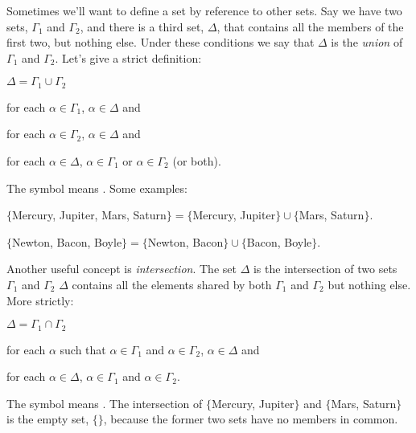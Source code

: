 Sometimes we'll want to define a set by reference to other sets. Say we have two sets, $\Gamma_1$ and $\Gamma_2$, and there is a third set, $\Delta$, that contains all the members of the first two, but nothing else. Under these conditions we say that $\Delta$ is the \emph{union} of $\Gamma_1$ and $\Gamma_2$. Let's give a strict definition:

\begin{majorILnc}{} $\Delta=\Gamma_1\cup\Gamma_2$ \Iff 
	\begin{cenumerate}
		\item for each $\alpha \in \Gamma_1$, $\alpha \in \Delta$ and
		\item for each $\alpha \in \Gamma_2$, $\alpha \in \Delta$ and
		\item for each $\alpha \in \Delta$, $\alpha \in \Gamma_1$ or $\alpha \in \Gamma_2$ (or both).
	\end{cenumerate}	
\end{majorILnc} 

\noindent{}The symbol \mention{$\cup$} means . Some examples:

\begin{center}
	\noindent{}$\{$Mercury, Jupiter, Mars, Saturn$\}=\{$Mercury, Jupiter$\}\cup\{$Mars, Saturn$\}$.
\end{center}

\begin{center}
	\noindent{}$\{$Newton, Bacon, Boyle$\}=\{$Newton, Bacon$\}\cup\{$Bacon, Boyle$\}$.
\end{center}

Another useful concept is \emph{intersection}.  The set $\Delta$ is the intersection of two sets $\Gamma_1$ and $\Gamma_2$ \Iff $\Delta$ contains all the elements shared by both $\Gamma_1$ and $\Gamma_2$ but nothing else. More strictly:

\begin{majorILnc}{} $\Delta=\Gamma_1\cap\Gamma_2$ \Iff 
	\begin{cenumerate}
		\item for each $\alpha$ such that $\alpha \in \Gamma_1$ and $\alpha \in \Gamma_2$, $\alpha \in \Delta$ and
		\item for each $\alpha \in \Delta$, $\alpha \in \Gamma_1$ and $\alpha \in \Gamma_2$.
	\end{cenumerate}	
\end{majorILnc} 

The symbol \mention{$\cap$} means .
The intersection of $\{$Mercury, Jupiter$\}$ and $\{$Mars, Saturn$\}$ is the empty set, $\{ \}$, because the former two sets have no members in common.

